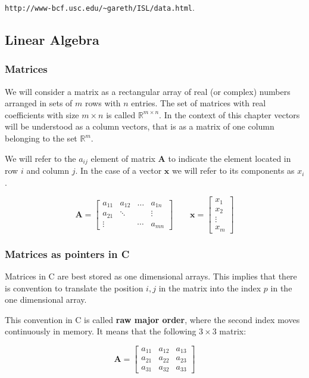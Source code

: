 \documentclass{article}
\newcommand{\real}{\mathbb{R}}
\begin{document}
\verb"http://www-bcf.usc.edu/~gareth/ISL/data.html".



\subsection{Linear Algebra}
\subsubsection{Matrices}
We will consider a matrix as a rectangular array of real (or complex) numbers arranged in sets of $m$ rows with $n$ entries. The set of matrices with real coefficients with size $m\times n$ is called $\real^{m\times n}$. In the context of this chapter vectors will be understood as a column vectors, that is as a matrix of one column belonging to the set $\real^{m}$. 

We will refer to the $a_{ij}$ element of matrix ${\mathbf A}$ to indicate the element located in row $i$ and column $j$. In the case of a vector ${\mathbf x}$ we will refer to its components as $x_{i}$.


\begin{displaymath}
\mathbf{A} = 
\left[
\begin{array}{cccc}
a_{11}  & a_{12}  & \dots & a_{1n}   \\
a_{21}  &  \ddots &  & \vdots  \\
\vdots  &  & \cdots & a_{mn}   
\end{array}
\right]
\qquad
\mathbf{x} = 
\left[
\begin{array}{c}
x_{1}     \\
x_2          \\
\vdots     \\
x_{m}   
\end{array}
\right]
\end{displaymath}


\subsubsection{Matrices as pointers in C}
Matrices in C are best stored as one dimensional arrays. This implies that there is convention to translate the position $i,j$ in the matrix into the index $p$ in the one dimensional array. 

This convention in C is called {\bf raw major order}, where the second index moves continuously in memory. It means that the following $3\times 3$ matrix:


\begin{displaymath}
\mathbf{A} = 
\left[
\begin{array}{ccc}
a_{11}  & a_{12} & a_{13}   \\
a_{21}  & a_{22}   & a_{23}  \\
a_{31}  & a_{32} & a_{33}   
\end{array}
\right]
\end{displaymath}
\end{document}
